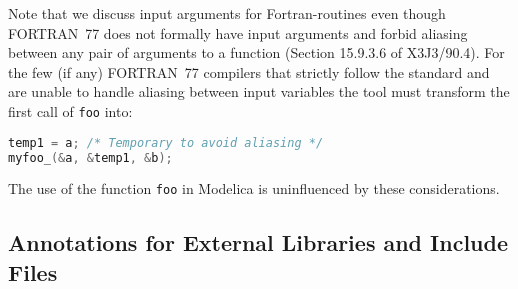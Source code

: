 \begin{example}
Note that we discuss input arguments for Fortran-routines even
though FORTRAN~77 does not formally have input arguments and forbid
aliasing between any pair of arguments to a function (Section 15.9.3.6
of X3J3/90.4). For the few (if any) FORTRAN~77 compilers that strictly
follow the standard and are unable to handle aliasing between input
variables the tool must transform the first call of \lstinline!foo! into:
\begin{lstlisting}[language=C]
temp1 = a; /* Temporary to avoid aliasing */
myfoo_(&a, &temp1, &b);
\end{lstlisting}

The use of the function \lstinline!foo! in Modelica is uninfluenced by these considerations.
\end{example}

\subsection{Annotations for External Libraries and Include Files}\label{annotations-for-external-libraries-and-include-files}

